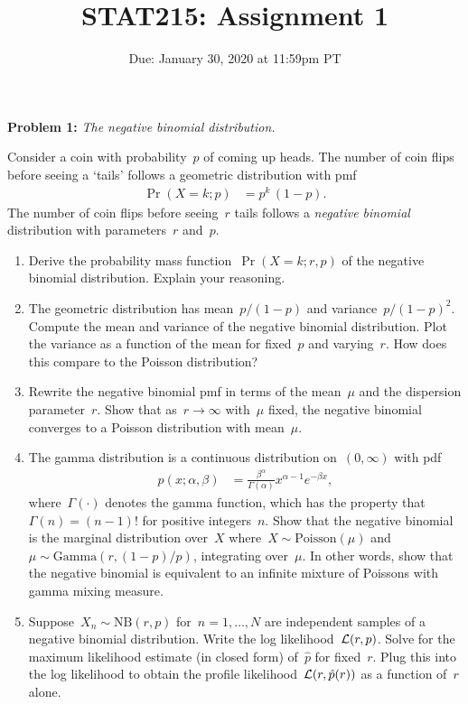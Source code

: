 \documentclass[11pt]{article}
\title{STAT215: Assignment 1}
\date{Due: January 30, 2020 at 11:59pm PT}
\begin{document}
\maketitle

\textbf{Problem 1:}  \textit{The negative binomial distribution.} 

Consider a coin with probability~$p$ of coming up heads.  The number of coin flips before seeing a `tails' follows a geometric distribution with pmf
\begin{align*}
    \Pr(X=k; p) &= p^k \, (1-p).
\end{align*}
The number of coin flips before seeing~$r$ tails follows a \emph{negative binomial} distribution with parameters~$r$ and~$p$.

\begin{enumerate}[label=(\alph*)]
    \item Derive the probability mass function~$\Pr(X=k; r, p)$ of the negative binomial distribution.  Explain your reasoning.
    
    \item The geometric distribution has mean~$p / (1-p)$ and variance~$p / (1-p)^2$.  Compute the mean and variance of the negative binomial distribution.  Plot the variance as a function of the mean for fixed~$p$ and varying~$r$.  How does this compare to the Poisson distribution?
    
    \item Rewrite the negative binomial pmf in terms of the mean~$\mu$ and the dispersion parameter~$r$.  Show that as~$r \to \infty$ with~$\mu$ fixed, the negative binomial converges to a Poisson distribution with mean~$\mu$.
    
    \item The gamma distribution is a continuous distribution on~$(0, \infty)$ with pdf
    \begin{align*}
        p(x; \alpha, \beta) &= \frac{\beta^\alpha}{\Gamma(\alpha)} x^{\alpha -1} e^{-\beta x},
    \end{align*}
    where~$\Gamma(\cdot)$ denotes the gamma function, which has the property that~$\Gamma(n) = (n-1)!$ for positive integers~$n$.  Show that the negative binomial is the marginal distribution over~$X$ where~${X \sim \mathrm{Poisson}(\mu)}$ and~${\mu \sim \mathrm{Gamma}(r, (1-p)/p )}$, integrating over~$\mu$.  In other words, show that the negative binomial is equivalent to an infinite mixture of Poissons with gamma mixing measure. 
    
    \item  Suppose~$X_n \sim \mathrm{NB}(r, p)$ for~$n=1, \ldots, N$ are independent samples of a negative binomial distribution.  Write the log likelihood~$\mathcal{L}(r, p)$.  Solve for the maximum likelihood estimate (in closed form) of~$\hat{p}$ for fixed~$r$.  Plug this into the log likelihood to obtain the profile likelihood~$\mathcal{L}(r, \hat{p}(r))$ as a function of~$r$ alone.  

\end{enumerate}
\end{document}
